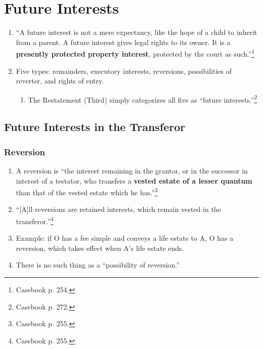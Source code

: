 \section{Future Interests}

\begin{enumerate}
    \item ``A future interest is not a mere expectancy, like the hope of a 
    child to inherit from a parent. A future interest gives legal rights to 
    its owner. It is a \textbf{presently protected property interest}, 
    protected by the court as such.''\footnote{Casebook p. 254.}
    \item Five types: remainders, executory interests, reversions, 
    possibilities of reverter, and rights of entry.
    \begin{enumerate}
        \item The Restatement (Third) simply categorizes all five as ``future 
        interests.''\footnote{Casebook p. 272.}
    \end{enumerate}
\end{enumerate}

\subsection{Future Interests in the Transferor}

\subsubsection{Reversion}

\begin{enumerate}
    \item A reversion is ``the interest remaining in the grantor, or in the 
    successor in interest of a testator, who transfers a \textbf{vested estate 
    of a lesser quantum} than that of the vested estate which he 
    has.''\footnote{Casebook p. 255.}
    \item ``[A]ll reversions are retained interests, which remain vested in 
    the transferor.''\footnote{Casebook p. 255.}
    \item Example: if O has a fee simple and conveys a life estate to A, O has 
    a reversion, which takes effect when A's life estate ends.
    \item There is no such thing as a ``possibility of reversion.''
\end{enumerate}

